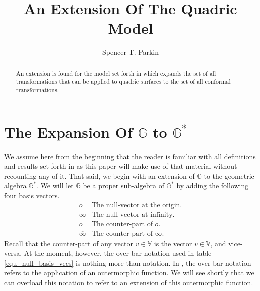 \documentclass{birkjour}
\theoremstyle{definition}
\theoremstyle{remark}
\numberwithin{equation}{section}
\newcommand{\G}{\mathbb{G}}
\newcommand{\V}{\mathbb{V}}
\newcommand{\nvao}{o}
\newcommand{\nvai}{\infty}
\newcommand{\nvaob}{\overline{o}}
\newcommand{\nvaib}{\overline{\infty}}
\begin{document}
\title{An Extension Of The Quadric Model}

\author{Spencer T. Parkin}
\address{%
2113 S. Claremont Dr.\\
Bountiful, Utah  84010\\
USA}





\begin{abstract}
An extension is found for the model set forth in \cite{Parkin12}
which expands the set of all transformations that can be applied
to quadric surfaces to the set of all conformal transformations.
\end{abstract}

\maketitle

\section{The Expansion Of $\G$ to $\G^*$}

We assume here from the beginning that the reader is familiar with
all definitions and results set forth in \cite{Parkin12} as this paper
will make use of that material without recounting any of it.
That said, we begin with an extension of $\G$ to the geometric
algebra $\G^*$.  We will let $\G$ be a proper sub-algebra of $\G^*$
by adding the following four basis vectors.
\begin{equation}\label{equ_null_basis_vecs}
\begin{array}{ll}
\nvao & \mbox{The null-vector at the origin.} \\
\nvai & \mbox{The null-vector at infinity.} \\
\nvaob & \mbox{The counter-part of $\nvao$.} \\
\nvaib & \mbox{The counter-part of $\nvai$.}
\end{array}
\end{equation}
Recall that the counter-part of any vector $v\in\V$ is the vector $\overline{v}\in\overline{\V}$,
and vice-versa.  At the moment, however, the over-bar notation used in table \eqref{equ_null_basis_vecs}
is nothing more than notation.  In \cite{Parkin12}, the over-bar notation refers to the application
of an outermorphic function.  We will see shortly that we can overload this notation to
refer to an extension of this outermorphic function.
\end{document}
